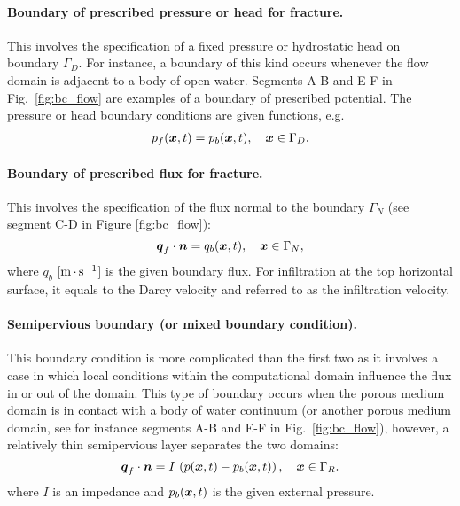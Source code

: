 \paragraph{Boundary of prescribed pressure or head for fracture.}
This involves the specification of a fixed pressure or hydrostatic head on boundary $\Gamma_D$.
For instance, a boundary of this kind occurs whenever the flow domain is adjacent to a body of open water.
Segments A-B and E-F in Fig.~\ref{fig:bc_flow} are examples of a boundary of prescribed potential.
The pressure or head boundary conditions are given functions, e.g.
\begin{align}
\label{eq:BC pressure DP}
  p_f({\boldsymbol{x}},t) = p_{b}({\boldsymbol{x}},t), \quad {\boldsymbol{x}} \in \Gamma_D. 
\end{align}

\paragraph{Boundary of prescribed flux for fracture.}
This involves the specification of the flux normal to the boundary $\Gamma_N$
(see segment C-D in Figure \ref{fig:bc_flow}):
\begin{equation}
\label{eq:BC flux DP}
  {\boldsymbol{q}}_f\cdot \boldsymbol{n} = q_{b}({\boldsymbol{x}},t), \quad {\boldsymbol{x}} \in \Gamma_N,
\end{equation}
where $q_b$ [${\rm m}{\,\cdot\,}{\rm s}^{-1}$] is the given boundary flux. 
For infiltration at the top horizontal surface, it equals to the Darcy velocity
and referred to as the infiltration velocity.

\paragraph{Semipervious boundary (or mixed boundary condition).}
This boundary condition is more complicated than the first two as it involves a case 
in which local conditions within the computational domain influence the flux in or 
out of the domain.
This type of boundary occurs when the porous medium domain is in contact with 
a body of water continuum (or another porous medium domain, see for instance segments 
A-B and E-F in Fig.~\ref{fig:bc_flow}), however, a relatively thin semipervious layer 
separates the two domains:
\begin{equation}
\label{eq:BC semipervious DP}
  {\boldsymbol{q}}_f \cdot \boldsymbol{n} = I\, \left(p ({\boldsymbol{x}},t) - p_{b}({\boldsymbol{x}},t) \right), \quad {\boldsymbol{x}} \in \Gamma_R.
\end{equation}
where $I$ is an impedance and $p_{b}({\boldsymbol{x}},t)$ is the given external pressure.

